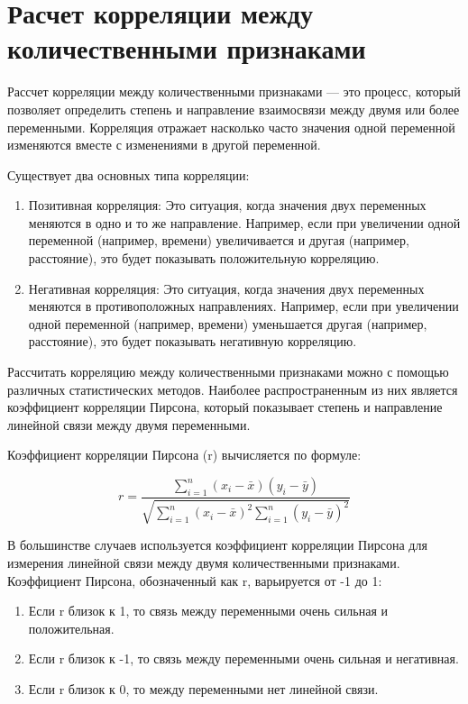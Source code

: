 \vspace{\baselineskip}\section{Расчет корреляции между количественными признаками}\vspace{\baselineskip}

Рассчет корреляции между количественными признаками — это процесс, который позволяет определить степень и направление взаимосвязи между двумя или более переменными. Корреляция отражает насколько часто значения одной переменной изменяются вместе с изменениями в другой переменной.


Существует два основных типа корреляции:

\begin{enumerate}
\item Позитивная корреляция: Это ситуация, когда значения двух переменных меняются в одно и то же направление. Например, если при увеличении одной переменной (например, времени) увеличивается и другая (например, расстояние), это будет показывать положительную корреляцию.
\item Негативная корреляция: Это ситуация, когда значения двух переменных меняются в противоположных направлениях. Например, если при увеличении одной переменной (например, времени) уменьшается другая (например, расстояние), это будет показывать негативную корреляцию.
\end{enumerate}

\par Рассчитать корреляцию между количественными признаками можно с помощью различных статистических методов. Наиболее распространенным из них является коэффициент корреляции Пирсона, который показывает степень и направление линейной связи между двумя переменными.

Коэффициент корреляции Пирсона (r) вычисляется по формуле:

$$r = \frac{\sum_{i=1}^{n}(x_i - \bar{x})(y_i - \bar{y})}{\sqrt{\sum_{i=1}^{n}(x_i - \bar{x})^2 \sum_{i=1}^{n}(y_i - \bar{y})^2}}$$


В большинстве случаев используется коэффициент корреляции Пирсона для измерения линейной связи между двумя количественными признаками. Коэффициент Пирсона, обозначенный как r, варьируется от -1 до 1:
\begin{enumerate}
\item Если r близок к 1, то связь между переменными очень сильная и положительная.
\item Если r близок к -1, то связь между переменными очень сильная и негативная.
\item Если r близок к 0, то между переменными нет линейной связи.
\end{enumerate}

